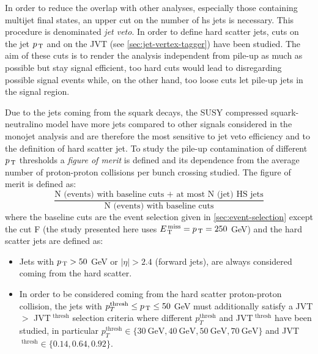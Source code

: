 In order to reduce the overlap with other analyses, especially those containing
multijet final states, an upper cut on the number of \gls{hs} jets is
necessary. This procedure is denominated \emph{jet veto}. In order to define
hard scatter jets, cuts on the jet $p_\mathrm{\, T}$ and on the JVT (see
\cref{sec:jet-vertex-tagger}) have been studied. The aim of these cuts is to
render the analysis independent from pile-up as much as possible but stay
signal efficient, too hard cuts would lead to disregarding possible signal
events while, on the other hand, too loose cuts let pile-up jets in the signal
region.

Due to the jets coming from the squark decays, the SUSY compressed
squark-neutralino model have more jets compared to other signals considered in
the monojet analysis and are therefore the most sensitive to jet veto efficiency
and to the definition of hard scatter jet. To study the pile-up contamination
of different $p_\mathrm{\, T}$ thresholds a \emph{figure of merit} is defined and its
dependence from the average number of proton-proton collisions per bunch
crossing studied. The figure of merit is defined as:
\begin{equation}
  \label{eq:fig_merit}
  \frac{\text{N (events) with baseline cuts + at
      most N (jet) HS jets}}{\text{N (events)
      with baseline cuts}}
\end{equation}
where the baseline cuts are the event selection given in
\cref{sec:event-selection} except the cut F (the study presented here uses
$E_\mathrm{\, T}^\mathrm{\, miss} = p_\mathrm{\, T} = 250$ GeV) and the hard scatter jets are defined as:
\begin{itemize}
\item Jets with $p_\mathrm{\, T} > 50$ GeV or $|\eta| > 2.4$ (forward jets), are always
  considered coming from the hard scatter.
\item In order to be considered coming from the hard scatter proton-proton
  collision, the jets with $p_T^{\text{thresh}} \leq p_\mathrm{\, T} \leq 50$ GeV must
  additionally satisfy a JVT $>$ JVT$^{\text{ thresh}}$ selection criteria where
  different $p_T^{\text{thresh}}$ and JVT$^{\text{ thresh}}$ have been studied,
  in particular
  $p_T^{\text{thresh}} \in \{30~\text{GeV}, 40~\text{GeV}, 50~\text{GeV},
  70~\text{GeV}\}$ and JVT$^{\text{ thresh}} \in \{0.14, 0.64, 0.92\}$.
\end{itemize}

